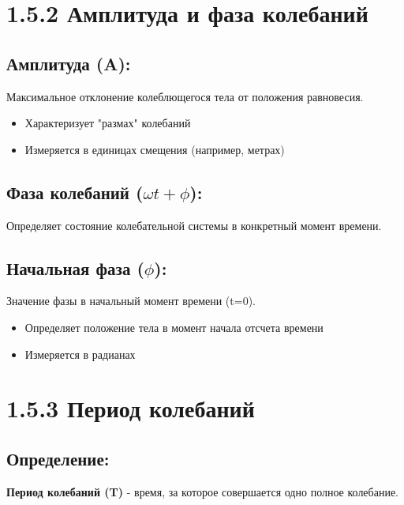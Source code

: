 \documentclass[a4paper,12pt]{article}
\begin{document}
\section*{1.5.2 Амплитуда и фаза колебаний}

\vspace{-9pt}
\subsection*{Амплитуда (A):}
\vspace{-3pt}
Максимальное отклонение колеблющегося тела от положения равновесия.
\begin{itemize}[itemsep=0pt, topsep=0pt, parsep=0pt]
    \item Характеризует "размах" колебаний
    \item Измеряется в единицах смещения (например, метрах)
\end{itemize}

\vspace{-9pt}
\subsection*{Фаза колебаний ($\omega t + \phi$):}
\vspace{-3pt}
Определяет состояние колебательной системы в конкретный момент времени.

\vspace{-9pt}
\subsection*{Начальная фаза ($\phi$):}
\vspace{-3pt}
Значение фазы в начальный момент времени (t=0).
\begin{itemize}[itemsep=0pt, topsep=0pt, parsep=0pt]
    \item Определяет положение тела в момент начала отсчета времени
    \item Измеряется в радианах
\end{itemize}

\newpage
\section*{1.5.3 Период колебаний}

\vspace{-9pt}
\subsection*{Определение:}
\vspace{-3pt}
\textbf{Период колебаний (T)} - время, за которое совершается одно полное колебание.
\end{document}
